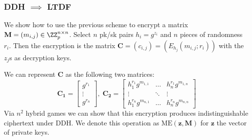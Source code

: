 \documentclass{beamer}
\begin{document}
\begin{frame}
    \frametitle{DDH $\implies$ LTDF}
    We show how to use the previous scheme to encrypt a matrix $\mathbf{M} = (m_{i, j}) \in \ZZ_p^{n \times n}$.
    Select $n$ pk/sk pairs $h_i = g^{z_i}$ and $n$ pieces of randomness $r_i$.
    Then the encryption is the matrix $\mathbf{C} = (c_{i,j}) = (E_{h_j}(m_{i,j}; r_i))$ with the $z_j$s as decryption keys.

    We can represent $\mathbf{C}$ as the following two matrices:
    \[ \mathbf{C_1} = \begin{bmatrix}
            g^{r_1} \\
            \vdots  \\
            g^{r_n}
        \end{bmatrix}, \;
        \mathbf{C_2} = \begin{bmatrix}
            h_1^{r_1} g^{m_{1,1}}  & \dots  & h_n^{r_1} g^{m_{1,n}}  \\
            \vdots                 & \ddots & \vdots                 \\
            h_1^{r_n} g^{m_{n, 1}} & \dots  & h_n^{r_n} g^{m_{n, n}}
        \end{bmatrix}\]
    Via $n^2$ hybrid games we can show that this encryption produces indistinguishable
    ciphertext under DDH. We denote this operation as $\mathrm{ME}(\mathbf{z}, \mathbf{M})$ for
    $\mathbf{z}$ the vector of private keys.
\end{frame}
\end{document}
